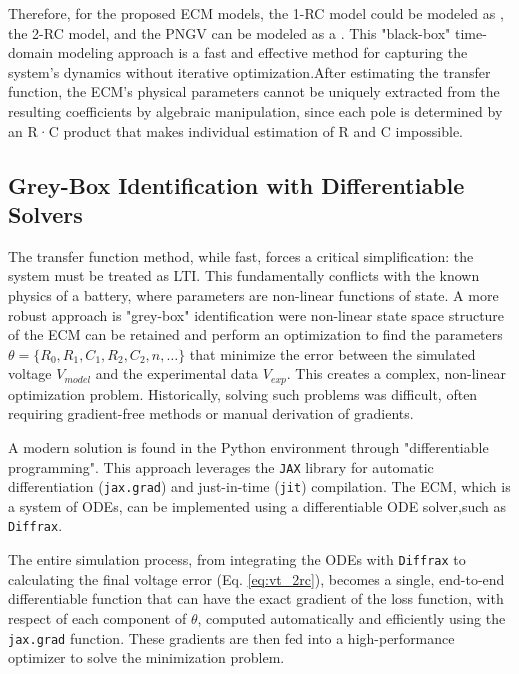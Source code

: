 \documentclass[lettersize,journal]{IEEEtran}
\begin{document}
Therefore, for the proposed ECM models, the 1-RC model could be modeled as , the 2-RC model, and the PNGV can be modeled as a . This "black-box" time-domain modeling approach is a fast and effective method for capturing the system's dynamics without iterative optimization\cite{khalfi2021boxjenkins, pai2023online}.After estimating the transfer function, the ECM’s physical parameters cannot be uniquely extracted from the resulting coefficients by algebraic manipulation, since each pole is determined by an R·C product that makes individual estimation of R and C impossible.

\subsection{Grey-Box Identification with Differentiable Solvers}

The transfer function method, while fast, forces a critical simplification: the system must be treated as LTI. This fundamentally conflicts with the known physics of a battery, where parameters are non-linear functions of state\cite{tran2021comprehensive}. A more robust approach is "grey-box" identification were non-linear state space structure of the ECM can be retained and perform an optimization to find the parameters $\theta = \{R_0, R_1, C_1, R_2, C_2,n, \dots\}$ that minimize the error between the simulated voltage $V_{model}$ and the experimental data $V_{exp}$. This creates a complex, non-linear optimization problem. Historically, solving such problems was difficult, often requiring gradient-free methods or manual derivation of gradients.

A modern solution is found in the Python environment through "differentiable programming". This approach leverages the \texttt{JAX} library for automatic differentiation (\texttt{jax.grad}) and just-in-time (\texttt{jit}) compilation\cite{kidger2021diffrax}. The ECM, which is a system of ODEs, can be implemented using a differentiable ODE solver,such as \texttt{Diffrax}.

The entire simulation process, from integrating the ODEs with \texttt{Diffrax} to calculating the final voltage error (Eq. \ref{eq:vt_2rc}), becomes a single, end-to-end differentiable function that can have the exact gradient of the loss function, with respect of each component of $\theta$, computed automatically and efficiently using the  \texttt{jax.grad} function. These gradients are then fed into a high-performance optimizer to solve the minimization problem.
\end{document}
